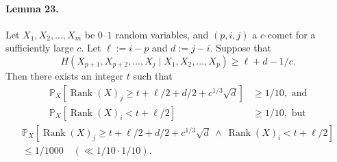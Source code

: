 \paragraph{Lemma 23.}
Let $X_1,X_2,\ldots,X_m$ be $0$--$1$ random variables, and $(p,i,j)$ a $c$-comet for a sufficiently large $c$. Let $\ell:=i-p$ and $d:=j-i$.
Suppose that
\[H(X_{p+1},X_{p+2},\ldots,X_j\mid X_1,X_2,\ldots,X_p)\geq\ell+d-1/c.\]
Then there exists an integer $t$ such that
\begin{align*}
\mathbb P_X[\operatorname{Rank}(X)_j\geq t+\ell/2+d/2+c^{1/3}\sqrt d]&\geq1/10,\text{ and}\\
\mathbb P_X[\operatorname{Rank}(X)_i<t+\ell/2]&\geq1/10,\text{ but}
\end{align*}
\begin{multline*}
\mathbb P_X[\operatorname{Rank}(X)_j\geq t+\ell/2+d/2+c^{1/3}\sqrt d\ \wedge\ \operatorname{Rank}(X)_i<t+\ell/2]\\
\leq1/1000\quad(\ll1/10\cdot1/10).
\end{multline*}
